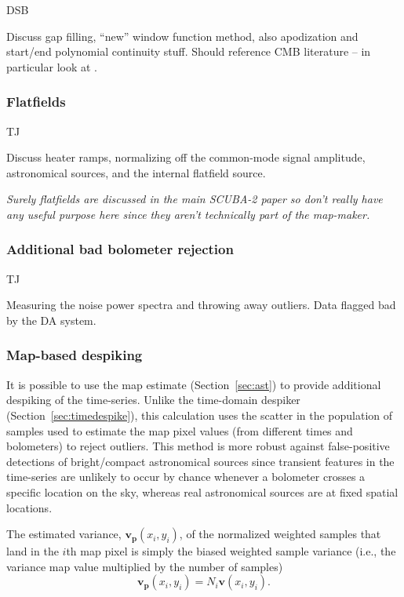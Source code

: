 \documentclass[useAMS,usenatbib,nofootinbib]{mn2e}
\begin{document}
DSB

Discuss gap filling, ``new'' window function method, also apodization
and start/end polynomial continuity stuff. Should reference CMB
literature -- in particular look at \citet{stompor2002}.

\subsubsection{Flatfields}
\label{sec:flatfields}

TJ

Discuss heater ramps, normalizing off the common-mode signal
amplitude, astronomical sources, and the internal flatfield source.

\textit{Surely flatfields are discussed in the main SCUBA-2 paper so
don't really have any useful purpose here since they aren't
technically part of the map-maker.}

\subsubsection{Additional bad bolometer rejection}

TJ

Measuring the noise power spectra and throwing away outliers. Data
flagged bad by the DA system.

\subsubsection{Map-based despiking}
\label{sec:mapdespike}

It is possible to use the map estimate (Section~\ref{sec:ast}) to
provide additional despiking of the time-series. Unlike the
time-domain despiker (Section~\ref{sec:timedespike}), this calculation
uses the scatter in the population of samples used to estimate the map
pixel values (from different times and bolometers) to reject
outliers. This method is more robust against false-positive detections
of bright/compact astronomical sources since transient features in the
time-series are unlikely to occur by chance whenever a bolometer
crosses a specific location on the sky, whereas real astronomical
sources are at fixed spatial locations.

The estimated variance, $\mathbf{v_p}(x_i,y_i)$, of the normalized
weighted samples that land in the $i$th map pixel is simply the biased
weighted sample variance (i.e., the variance map value multiplied by
the number of samples)
%
\begin{equation}
  \mathbf{v_p}(x_i,y_i) = N_i \mathbf{v}(x_i,y_i).
\end{equation}
\end{document}
